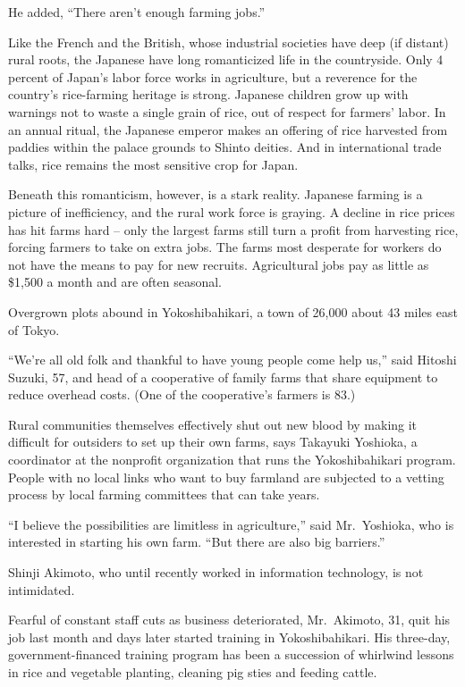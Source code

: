 \documentclass[12pt,a4paper,onecolumn]{article}
\begin{document}
He added, ``There aren't enough farming jobs.''

Like the French and the British, whose industrial societies have deep (if distant) rural roots, the
Japanese have long romanticized life in the countryside. Only 4 percent of Japan's labor force works
in agriculture, but a reverence for the country's rice-farming heritage is strong. Japanese children
grow up with warnings not to waste a single grain of rice, out of respect for farmers' labor. In an
annual ritual, the Japanese emperor makes an offering of rice harvested from paddies within the
palace grounds to Shinto deities. And in international trade talks, rice remains the most sensitive
crop for Japan.

Beneath this romanticism, however, is a stark reality. Japanese farming is a picture of
inefficiency, and the rural work force is graying. A decline in rice prices has hit farms hard --
only the largest farms still turn a profit from harvesting rice, forcing farmers to take on extra
jobs. The farms most desperate for workers do not have the means to pay for new recruits.
Agricultural jobs pay as little as \$1,500 a month and are often seasonal.

Overgrown plots abound in Yokoshibahikari, a town of 26,000 about 43 miles east of Tokyo.

``We're all old folk and thankful to have young people come help us,'' said Hitoshi Suzuki, 57, and
head of a cooperative of family farms that share equipment to reduce overhead costs. (One of the
cooperative's farmers is 83.)

Rural communities themselves effectively shut out new blood by making it difficult for outsiders to
set up their own farms, says Takayuki Yoshioka, a coordinator at the nonprofit organization that
runs the Yokoshibahikari program. People with no local links who want to buy farmland are subjected
to a vetting process by local farming committees that can take years.

``I believe the possibilities are limitless in agriculture,'' said Mr.~Yoshioka, who is interested
in starting his own farm. ``But there are also big barriers.''

Shinji Akimoto, who until recently worked in information technology, is not intimidated.

Fearful of constant staff cuts as business deteriorated, Mr.~Akimoto, 31, quit his job last month
and days later started training in Yokoshibahikari. His three-day, government-financed training
program has been a succession of whirlwind lessons in rice and vegetable planting, cleaning pig
sties and feeding cattle.
\end{document}
